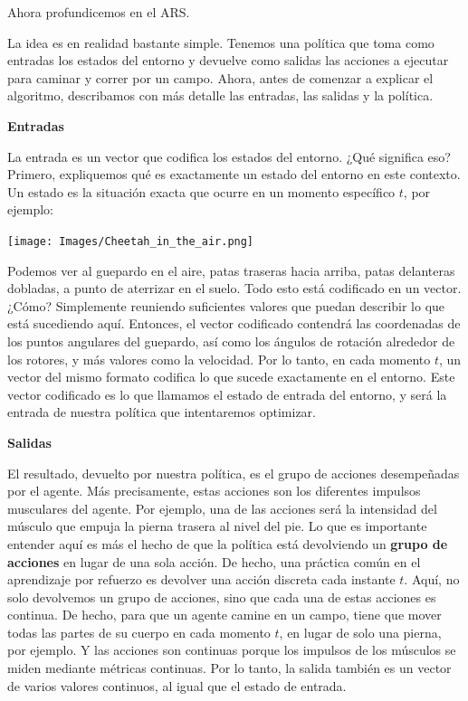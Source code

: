 \documentclass[
]{book}
\begin{document}
Ahora profundicemos en el ARS.

La idea es en realidad bastante simple. Tenemos una política que toma como entradas los estados del entorno y devuelve como salidas las acciones a ejecutar para caminar y correr por un campo. Ahora, antes de comenzar a explicar el algoritmo, describamos con más detalle las entradas, las salidas y la política.

\textbf{Entradas}

La entrada es un vector que codifica los estados del entorno. ¿Qué significa eso? Primero, expliquemos qué es exactamente un estado del entorno en este contexto. Un estado es la situación exacta que ocurre en un momento específico \(t\), por ejemplo:

\texttt{[image: Images/Cheetah\_in\_the\_air.png]}

Podemos ver al guepardo en el aire, patas traseras hacia arriba, patas delanteras dobladas, a punto de aterrizar en el suelo. Todo esto está codificado en un vector. ¿Cómo? Simplemente reuniendo suficientes valores que puedan describir lo que está sucediendo aquí. Entonces, el vector codificado contendrá las coordenadas de los puntos angulares del guepardo, así como los ángulos de rotación alrededor de los rotores, y más valores como la velocidad. Por lo tanto, en cada momento \(t\), un vector del mismo formato codifica lo que sucede exactamente en el entorno. Este vector codificado es lo que llamamos el estado de entrada del entorno, y será la entrada de nuestra política que intentaremos optimizar.

\textbf{Salidas}

El resultado, devuelto por nuestra política, es el grupo de acciones desempeñadas por el agente. Más precisamente, estas acciones son los diferentes impulsos musculares del agente. Por ejemplo, una de las acciones será la intensidad del músculo que empuja la pierna trasera al nivel del pie. Lo que es importante entender aquí es más el hecho de que la política está devolviendo un \textbf{grupo de acciones} en lugar de una sola acción. De hecho, una práctica común en el aprendizaje por refuerzo es devolver una acción discreta cada instante \(t\). Aquí, no solo devolvemos un grupo de acciones, sino que cada una de estas acciones es continua. De hecho, para que un agente camine en un campo, tiene que mover todas las partes de su cuerpo en cada momento \(t\), en lugar de solo una pierna, por ejemplo. Y las acciones son continuas porque los impulsos de los músculos se miden mediante métricas continuas. Por lo tanto, la salida también es un vector de varios valores continuos, al igual que el estado de entrada.
\end{document}
